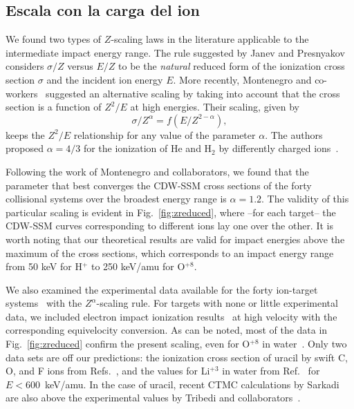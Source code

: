 \subsection{Escala con la carga del ion}
\label{sec:zscaling}

We found two types of $Z$-scaling laws in the literature applicable 
to the intermediate impact energy range. The rule suggested by Janev 
and Presnyakov~\cite{janev1980} considers $\sigma/Z$ versus $E/Z$ to be 
the \textit{natural} reduced form of the ionization cross section 
$\sigma$ and the incident ion energy $E$. More recently, Montenegro and 
co-workers~\cite{dubois13,montenegro_pra13} suggested an alternative 
scaling by taking into account that the cross section is a function of 
$Z^2/E$ at high energies. Their scaling, given by 
\begin{equation}
 \sigma/Z^{\alpha}=f(E/Z^{2-\alpha}),
\label{eq:Montenegro}
\end{equation}
keeps the $Z^2/E$ relationship for any value of the parameter 
$\alpha$. The authors proposed $\alpha=4/3$ for the ionization of He and 
H$_2$ by differently charged ions~\cite{dubois13}. 
 
Following the work of Montenegro and collaborators, we found that the 
parameter that best converges the CDW-SSM cross sections of the forty 
collisional systems over the broadest energy range is $\alpha=1.2$. 
The validity of this particular scaling is evident in 
Fig.~\ref{fig:zreduced}, where --for each target-- the CDW-SSM curves
corresponding to different ions lay one over the other. 
It is worth noting that our theoretical results are valid for impact
energies above the maximum of the cross sections, which corresponds to 
an impact energy range from 50 keV for H$^+$ to 250 keV/amu for 
O$^{+8}$.

We also examined the experimental data available for the forty 
ion-target systems~\cite{itoh2013,iriki2011,wolff2014,wang2016,
tribedi2019,agnihotri2012,agnihotri2013,Luna2007,Rudd86,pRudd85,
toburen80,Ohsawa05,Bhattacharjee17,Luna_Li_water,DalCappello2009,
Tribedi_O_water} with the $Z^\alpha$-scaling rule. For targets with 
none or little experimental data, we included electron impact 
ionization results~\cite{rahman2016,bug2017,wolf2019,fuss2009} at high 
velocity with the corresponding equivelocity conversion. As can be 
noted, most of the data in Fig.~\ref{fig:zreduced} confirm the present 
scaling, even for O$^{+8}$ in water~\cite{Tribedi_O_water}. Only two 
data sets are off our predictions: the ionization cross section of 
uracil by swift C, O, and F ions from Refs.~\cite{agnihotri2012,
agnihotri2013}, and the values for Li$^{+3}$ in water from 
Ref.~\cite{Luna_Li_water} for $E<600$~keV/amu. In the case of uracil, 
recent CTMC calculations by Sarkadi~\cite{sarkadi2016} are also above 
the experimental values by Tribedi and collaborators~\cite{agnihotri2012,
agnihotri2013}.

